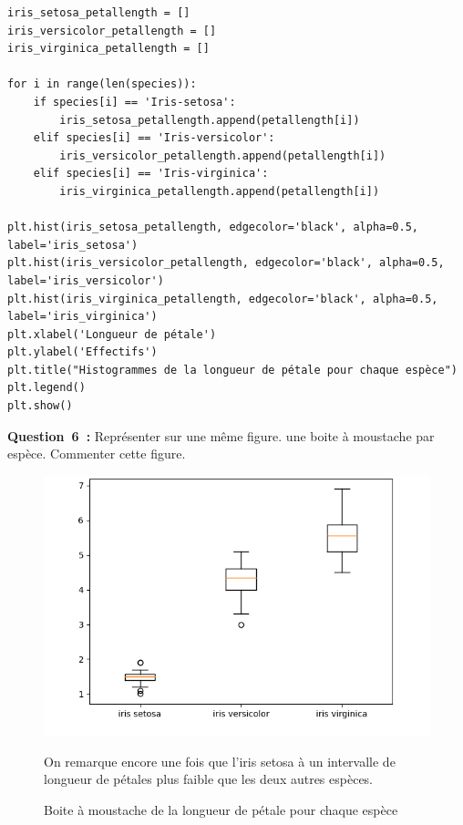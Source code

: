 \begin{lstlisting}[style=myPython, caption=Code Python pour calculer le coefficient de corrélation, frame=lines]
iris_setosa_petallength = []
iris_versicolor_petallength = []
iris_virginica_petallength = []

for i in range(len(species)):
    if species[i] == 'Iris-setosa':
        iris_setosa_petallength.append(petallength[i])
    elif species[i] == 'Iris-versicolor':
        iris_versicolor_petallength.append(petallength[i])
    elif species[i] == 'Iris-virginica':
        iris_virginica_petallength.append(petallength[i])

plt.hist(iris_setosa_petallength, edgecolor='black', alpha=0.5, label='iris_setosa')
plt.hist(iris_versicolor_petallength, edgecolor='black', alpha=0.5, label='iris_versicolor')
plt.hist(iris_virginica_petallength, edgecolor='black', alpha=0.5, label='iris_virginica')
plt.xlabel('Longueur de pétale')
plt.ylabel('Effectifs')
plt.title("Histogrammes de la longueur de pétale pour chaque espèce")
plt.legend()
plt.show()
\end{lstlisting}

\vspace{.5cm}


\noindent
\textbf{Question~6~:} Représenter sur une même figure. une boite à moustache par espèce. Commenter cette
figure.
\vspace{.2cm}

\begin{figure}[!h]
    \centering
    \begin{minipage}{.66\linewidth}
        \begin{center}
            \includegraphics[width=1\textwidth]{img/Figure_4.png}
            \caption{\label{fig:figure4}Boite à moustache de la longueur de pétale pour chaque espèce}
        \end{center}
    \end{minipage}\hfill
    \begin{minipage}{.30\linewidth}
        On remarque encore une fois que l'iris setosa à un intervalle de longueur de pétales plus faible que les deux autres espèces.
    \end{minipage}
\end{figure}

